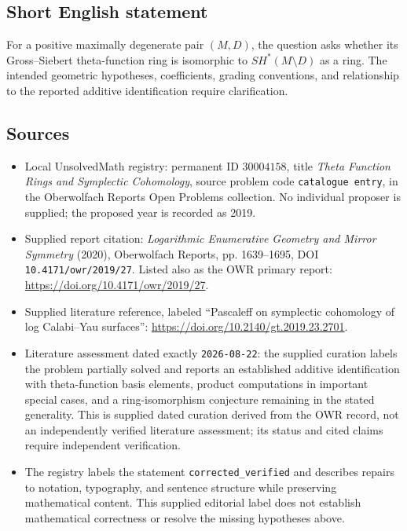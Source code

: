 \documentclass[11pt]{article}
\begin{document}
\subsection{Short English statement}
For a positive maximally degenerate pair \((M,D)\), the question asks whether its Gross--Siebert theta-function ring is isomorphic to \(SH^*(M\setminus D)\) as a ring. The intended geometric hypotheses, coefficients, grading conventions, and relationship to the reported additive identification require clarification.
\subsection{Sources}
\begin{itemize}
\item Local UnsolvedMath registry: permanent ID \(30004158\), title \emph{Theta Function Rings and Symplectic Cohomology}, source problem code \texttt{catalogue entry}, in the Oberwolfach Reports Open Problems collection. No individual proposer is supplied; the proposed year is recorded as 2019.
\item Supplied report citation: \emph{Logarithmic Enumerative Geometry and Mirror Symmetry} (2020), Oberwolfach Reports, pp. 1639--1695, DOI \texttt{10.4171/owr/2019/27}. Listed also as the OWR primary report: \url{https://doi.org/10.4171/owr/2019/27}.
\item Supplied literature reference, labeled ``Pascaleff on symplectic cohomology of log Calabi--Yau surfaces'': \url{https://doi.org/10.2140/gt.2019.23.2701}.
\item Literature assessment dated exactly \texttt{2026-08-22}: the supplied curation labels the problem partially solved and reports an established additive identification with theta-function basis elements, product computations in important special cases, and a ring-isomorphism conjecture remaining in the stated generality. This is supplied dated curation derived from the OWR record, not an independently verified literature assessment; its status and cited claims require independent verification.
\item The registry labels the statement \texttt{corrected\_verified} and describes repairs to notation, typography, and sentence structure while preserving mathematical content. This supplied editorial label does not establish mathematical correctness or resolve the missing hypotheses above.
\end{itemize}
\end{document}
